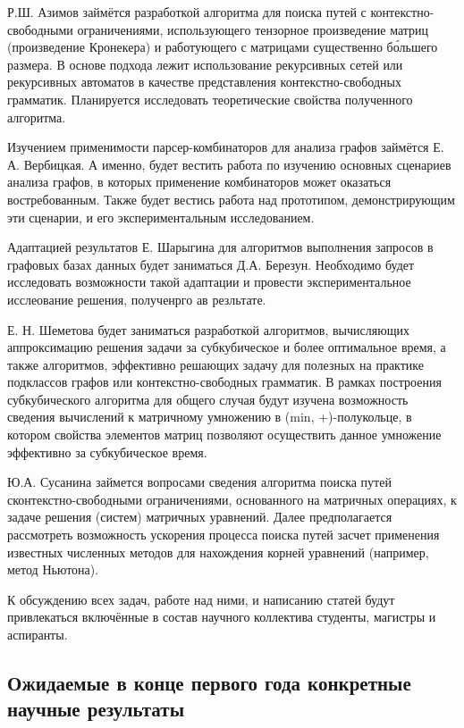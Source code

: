 \documentclass[12pt]{article}  %
\theoremstyle{remark}
\begin{document}
Р.Ш. Азимов займётся разработкой алгоритма для поиска путей с контекстно-свободными ограничениями, использующего тензорное произведение матриц (произведение Кронекера) и работующего с матрицами существенно б\'{о}льшего размера.
В основе подхода лежит использование рекурсивных сетей или рекурсивных автоматов в качестве представления контекстно-свободных грамматик.
Планируется исследовать теоретические свойства полученного алгоритма.

Изучением применимости парсер-комбинаторов для анализа графов займётся Е. А. Вербицкая.
А именно, будет вестить работа по изучению основных сценариев анализа графов, в которых применение комбинаторов может оказаться востребованным.
Также будет вестись работа над прототипом, демонстрирующим эти сценарии, и его экспериментальным исследованием.

Адаптацией результатов Е. Шарыгина для алгоритмов выполнения запросов в графовых базах данных будет заниматься Д.А. Березун.
Необходимо будет исследовать возможности такой адаптации и провести экспериментальное исслеование решения, полученрго ав резльтате.

Е. Н. Шеметова будет заниматься разработкой алгоритмов, вычисляющих аппроксимацию решения задачи за субкубическое и более оптимальное время, а также алгоритмов, эффективно решающих задачу для полезных на практике подклассов графов или контекстно-свободных грамматик. В рамках построения субкубического алгоритма для общего случая будут изучена возможность сведения вычислений к матричному умножению в (min, +)-полукольце, в котором свойства элементов матриц позволяют осуществить данное умножение эффективно за субкубическое время.

Ю.А. Сусанина займется вопросами сведения алгоритма поиска путей сконтекстно-свободными ограничениями, основанного на матричных операциях, к задаче решения (систем) матричных уравнений.
Далее предполагается рассмотреть возможность ускорения процесса поиска путей засчет применения известных численных методов для нахождения корней уравнений (например, метод Ньютона).

К обсуждению всех задач, работе над ними, и написанию статей будут привлекаться включённые в состав научного коллектива студенты, магистры и аспиранты.

\subsection{Ожидаемые в конце первого года конкретные научные результаты}
\end{document}
